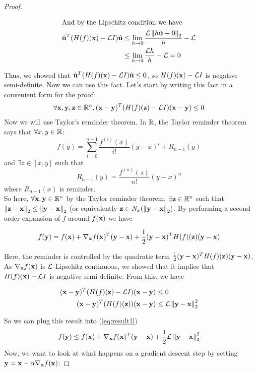 \begin{proof}
\begin{ceqn}
\begin{align*}
            \intertext{And by the Lipschitz condition we have}
            \vuhat^T(H(f)(\vx) - \Lip I) \vuhat  &\leq \lim_{h \to 0} \frac{\Lip \norm{h\vuhat - 0}_2}{h} - \Lip \\
            &\leq \lim_{h \to 0} \frac{\Lip h}{h} - \Lip = 0
        \end{align*}
    \end{ceqn}
    Thus, we showed that $\vuhat^T(H(f)(\vx) - \Lip I) \vuhat \leq 0$, so $H(f)(\vx) - \Lip I$ is negative semi-definite. Now we can use this fact. Let's start by writing this fact in a convenient form for the proof:
    $$\forall \vx,\vy,\vz \in \R^n, (\vx-\vy)^T(H(f)(\vz) - \Lip I)(\vx - \vy) \leq 0$$
    Now we will use Taylor's reminder theorem. In $\R$, the Taylor reminder theorem says that $\forall x,y \in \R$:
    $$f(y) = \sum_{i=0}^{n-1} \frac{f^{(i)}(x)}{i!}(y-x)^i + R_{n-1}(y) $$ and $ \exists z \in [x,y]$ such that 
    $$R_{n-1}(y) =  \frac{f^{(n)}(z)}{n!}(y-x)^n$$ 
    where $R_{n-1}(x)$ is reminder. \\
    So here, $\forall \vx, \vy \in \R^n$ by the Taylor reminder theorem, $\exists \vz \in \R^n$ such that $\norm{\vz - \vx}_2 \leq \norm{\vy - \vx}_2$ (or equivalently $\vz \in N_x(\norm{\vy - \vx}_2)$. By performing a second order expansion of $f$ around $f(\vx)$ we have
    \begin{ceqn}
        \begin{align}
            f(\vy) = f(\vx) + \nabla_\vx f(\vx)^T(\vy-\vx) + \frac{1}{2}(\vy-\vx)^T H(f)(\vz)(\vy-\vx) \label{eq:result1}
        \end{align}
    \end{ceqn}
    Here, the reminder is controlled by the quadratic term $\frac{1}{2}(\vy-\vx)^T H(f)(\vz)(\vy-\vx)$. As $\nabla_\vx f(\vx)$ is $\Lip$-Lipschitz continuous, we showed that it implies that $H(f)(\vx) - \Lip I$ is negative semi-definite. From this, we have 
    \begin{ceqn}
        \begin{align*}
            (\vx-\vy)^T(H(f)(\vz) - \Lip I)(\vx - \vy) &\leq 0 \\
            (\vx-\vy)^T(H(f)(\vz))(\vx - \vy) &\leq \Lip \norm{\vy-\vx}_2^2 
        \end{align*}
    \end{ceqn}
    So we can plug this result into (\ref{eq:result1})
    $$f(\vy) \leq f(\vx) + \nabla_\vx f(\vx)^T(\vy-\vx) + \frac{1}{2} \Lip \norm{\vy-\vx}_2^2$$
    Now, we want to look at what happens on a gradient descent step by setting $\vy = \vx - \alpha \nabla_\vx f(\vx)$:  

\end{proof}
